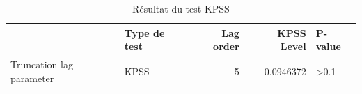 \begin{table}[!h]
\centering
\caption{Résultat du test KPSS}
\centering
\begin{tabular}[t]{llrrl}
\toprule
  & Type de test & Lag order & KPSS Level & P-value\\
\midrule
Truncation lag parameter & KPSS & 5 & 0.0946372 & >0.1\\
\bottomrule
\end{tabular}
\end{table}
